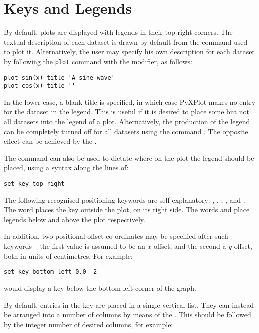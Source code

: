 \section{Keys and Legends}

By default, plots are displayed with legends in their top-right corners. The
textual description of each dataset is drawn by default from the command used
to plot it. Alternatively, the user may specify his own description for each
dataset by following the {\tt plot} command with the  modifier,
as follows:

\begin{verbatim}
plot sin(x) title 'A sine wave'
plot cos(x) title ''
\end{verbatim}

In the lower case, a blank title is specified, in which case PyXPlot makes no
entry for the dataset in the legend. This is useful if it is desired to place
some but not all datasets into the legend of a plot.  Alternatively, the
production of the legend can be completely turned off for all datasets using
the command . The opposite effect can be achieved by the
.

The  command can also be used to dictate where on the plot the
legend should be placed, using a syntax along the lines of:

\begin{verbatim}
set key top right
\end{verbatim}

The following recognised positioning keywords are self-explanatory:
, , , ,
 and . The word  places the
key outside the plot, on its right side. The words  and
 place legends below and above the plot respectively.

In addition, two positional offset co-ordinates may be specified after such
keywords -- the first value is assumed to be an $x$-offset, and the second a
$y$-offset, both in units of centimetres. For example:

\begin{verbatim}
set key bottom left 0.0 -2
\end{verbatim}

\noindent would display a key below the bottom left corner of the graph.

By default, entries in the key are placed in a single vertical list. They can
instead be arranged into a number of columns by means of the . This should be followed by the integer number of desired columns,
for example:

